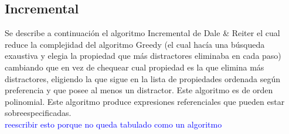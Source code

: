 

\subsection{Incremental}

Se describe a continuaci\'on el algoritmo Incremental de Dale \& Reiter el cual reduce la complejidad del algoritmo Greedy (el cual hac\'ia una b\'usqueda exaustiva y elegia la propiedad que m\'as distractores eliminaba en cada paso) cambiando que en vez de chequear cual propiedad es la que elimina m\'as distractores, eligiendo la que sigue en la lista de propiedades ordenada seg\'un preferencia y que posee al menos un distractor. Este algoritmo es de orden polinomial. Este algoritmo produce expresiones referenciales que pueden estar sobreespecificadas.\\

\textcolor{blue}{reescribir esto porque no queda tabulado como un algoritmo}


